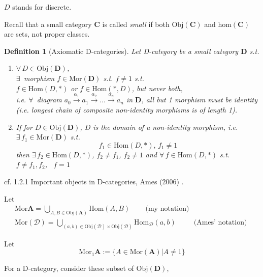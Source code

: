 \documentclass[10pt]{amsart}
\newtheorem{definition}{Definition}
\begin{document}
\begin{multicols*}{2}
$D$ stands for discrete.

Recall that a small category $\mathbf{C}$ is called \emph{small} if both $\text{Obj}(\mathbf{C})$ and $\text{hom}(\mathbf{C})$ are sets, not proper classes. 

\begin{definition}[Axiomatic D-categories]
Let D-category be a \emph{small} category $\mathbf{D}$ s.t.
\begin{enumerate}
	\item $\forall \, D \in \text{Obj}(\mathbf{D})$, \\
	$\exists \,$ morphism $f \in \text{Mor}(\mathbf{D})$ s.t. $f \neq 1$ s.t. \\
	$f \in \text{Hom}(D, *)$ or $f\in \text{Hom}(*, D)$, but never both, \\
	i.e. $\forall \, $ diagram $a_0 \xrightarrow{ \alpha_1} a_1 \xrightarrow{ \alpha_2} \dots \xrightarrow{ \alpha_n} a_n$ in $\mathbf{D}$, all but 1 morphism must be identity (i.e. longest chain of composite non-identity morphisms is of length 1). 
	\item If for $D\in \text{Obj}(\mathbf{D})$, $D$ is the domain of a non-identity morphism, i.e. $\exists \, f_1 \in \text{Mor}(\mathbf{D})$ s.t. 
	\[
	f_1 \in \text{Hom}(D, *), \, f_1 \neq 1
	\]
	then $\exists \, f_2 \in \text{Hom}(D, *)$, $f_2 \neq f_1$, $f_2 \neq 1$ and $\forall \, f \in \text{Hom}(D, *)$ s.t. $f\neq f_1,f_2$, \, $f=1$
\end{enumerate}
\end{definition}
	
cf. 1.2.1 Important objects in D-categories, Ames (2006) \cite{Ames2006}.

Let 
\[
\begin{gathered}
	\text{Mor}{\mathbf{A}} = \bigcup_{A, B \in \text{Obj}(\mathbf{A})} \text{Hom}(A,B) \qquad \, \text{(my notation)} \\
	\text{Mor}(\mathcal{D}) = \bigcup_{(a,b) \in \text{Obj}(\mathcal{D}) \times \text{Obj}(\mathcal{D}) } \text{Hom}_{\mathcal{D}}(a,b) \qquad \, \text{ (Ames' notation) }
\end{gathered}
\]	
	
Let 
\begin{equation}
\text{Mor}_{1}{\mathbf{A}} := \lbrace A \in \text{Mor}(\mathbf{A}) | A \neq 1 \rbrace 
\end{equation}

For a D-category, consider these subset of $\text{Obj}(\mathbf{D})$, 


\end{multicols*}
\end{document}
